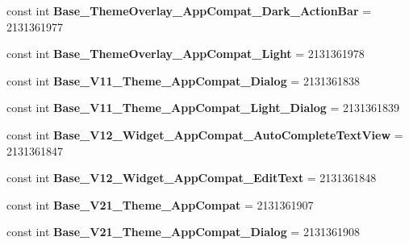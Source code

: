 \begin{DoxyCompactItemize}
const int {\bfseries Base\+\_\+\+Theme\+Overlay\+\_\+\+App\+Compat\+\_\+\+Dark\+\_\+\+Action\+Bar} = 2131361977
\item 
\mbox{\label{class_sample_app_1_1_droid_1_1_resource_1_1_style_a8c92cd6a8ad8b20aa57c6aeb34e760f2}} 
const int {\bfseries Base\+\_\+\+Theme\+Overlay\+\_\+\+App\+Compat\+\_\+\+Light} = 2131361978
\item 
\mbox{\label{class_sample_app_1_1_droid_1_1_resource_1_1_style_a9ac26e99756981cd117c17395c95e492}} 
const int {\bfseries Base\+\_\+\+V11\+\_\+\+Theme\+\_\+\+App\+Compat\+\_\+\+Dialog} = 2131361838
\item 
\mbox{\label{class_sample_app_1_1_droid_1_1_resource_1_1_style_ace04c9930f480cdca0718428ec755497}} 
const int {\bfseries Base\+\_\+\+V11\+\_\+\+Theme\+\_\+\+App\+Compat\+\_\+\+Light\+\_\+\+Dialog} = 2131361839
\item 
\mbox{\label{class_sample_app_1_1_droid_1_1_resource_1_1_style_a4eecc7eaf64b12ca35e6099b0f332213}} 
const int {\bfseries Base\+\_\+\+V12\+\_\+\+Widget\+\_\+\+App\+Compat\+\_\+\+Auto\+Complete\+Text\+View} = 2131361847
\item 
\mbox{\label{class_sample_app_1_1_droid_1_1_resource_1_1_style_a27159d5053f500fa385177a25aad157e}} 
const int {\bfseries Base\+\_\+\+V12\+\_\+\+Widget\+\_\+\+App\+Compat\+\_\+\+Edit\+Text} = 2131361848
\item 
\mbox{\label{class_sample_app_1_1_droid_1_1_resource_1_1_style_a49384072bf78e4f08b4b27bca4ccaf54}} 
const int {\bfseries Base\+\_\+\+V21\+\_\+\+Theme\+\_\+\+App\+Compat} = 2131361907
\item 
\mbox{\label{class_sample_app_1_1_droid_1_1_resource_1_1_style_ad337fb0726e0c97bc971d8251eee417c}} 
const int {\bfseries Base\+\_\+\+V21\+\_\+\+Theme\+\_\+\+App\+Compat\+\_\+\+Dialog} = 2131361908
\item 
\mbox{\label{class_sample_app_1_1_droid_1_1_resource_1_1_style_a2fa3c3fc75e6b97743941c506ae80132}} 

\end{DoxyCompactItemize}
